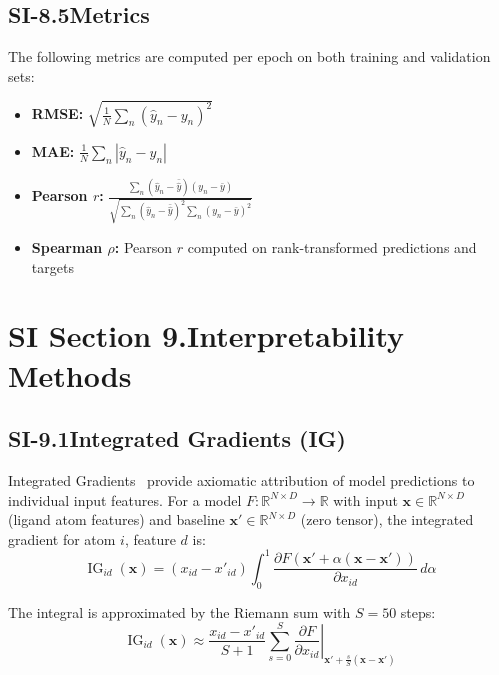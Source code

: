 \documentclass[11pt]{article}
\begin{document}
\subsection*{SI-8.5\quad Metrics}

The following metrics are computed per epoch on both training and
validation sets:
\begin{itemize}[leftmargin=1.5em]
  \item \textbf{RMSE:}
    $\sqrt{\frac{1}{N}\sum_{n}(\hat{y}_n - y_n)^2}$
  \item \textbf{MAE:}
    $\frac{1}{N}\sum_{n}|\hat{y}_n - y_n|$
  \item \textbf{Pearson $r$:}
    $\frac{\sum_n(\hat{y}_n - \bar{\hat{y}})(y_n - \bar{y})}
    {\sqrt{\sum_n(\hat{y}_n - \bar{\hat{y}})^2 \sum_n(y_n - \bar{y})^2}}$
  \item \textbf{Spearman $\rho$:}
    Pearson $r$ computed on rank-transformed predictions and targets
\end{itemize}

\label{si:training_end}

\section*{SI Section 9.\quad Interpretability Methods}
\label{si:interpret}

\subsection*{SI-9.1\quad Integrated Gradients (IG)}

Integrated Gradients~\cite{sundararajan2017axiomatic} provide axiomatic
attribution of model predictions to individual input features.
For a model $F: \mathbb{R}^{N \times D} \to \mathbb{R}$ with input
$\mathbf{x} \in \mathbb{R}^{N \times D}$ (ligand atom features) and
baseline $\mathbf{x}' \in \mathbb{R}^{N \times D}$ (zero tensor),
the integrated gradient for atom $i$, feature $d$ is:
\begin{equation}
  \operatorname{IG}_{id}(\mathbf{x}) = (x_{id} - x'_{id})
  \int_0^1
  \frac{\partial F(\mathbf{x}' + \alpha(\mathbf{x} - \mathbf{x}'))}
       {\partial x_{id}} \, d\alpha
  \label{eq:ig}
\end{equation}

The integral is approximated by the Riemann sum with $S = 50$ steps:
\begin{equation}
  \operatorname{IG}_{id}(\mathbf{x}) \approx
  \frac{x_{id} - x'_{id}}{S + 1}
  \sum_{s=0}^{S}
  \left.\frac{\partial F}{\partial x_{id}}\right|_{
    \mathbf{x}' + \frac{s}{S}(\mathbf{x} - \mathbf{x}')
  }
  \label{eq:ig_riemann}
\end{equation}
\end{document}
